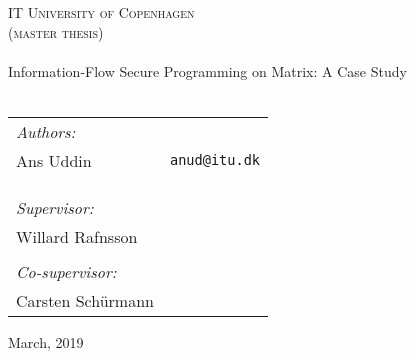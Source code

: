 \begin{center}
  \thispagestyle{empty}

  \textsc{\LARGE IT University of Copenhagen}\\[0.5cm]
  \textsc{\Large  (master thesis)}\\[2cm]

  \HRule\\[0.4cm]
  {\Huge \sffamily Information-Flow Secure Programming on Matrix: A Case Study \\ [0.4cm]}
  \HRule\\[3cm]

  \begin{tabular}{lr}
  	\textit{Authors:} \\
    Ans Uddin                     & \texttt{anud@itu.dk} \\
    \\
    \\
    \\
    \textit{Supervisor:}\\
    Willard Rafnsson \\
    \\
    \textit{Co-supervisor:}\\
    Carsten Schürmann\\
  \end{tabular}

  \vfill
  {\large March, 2019}
\end{center}
